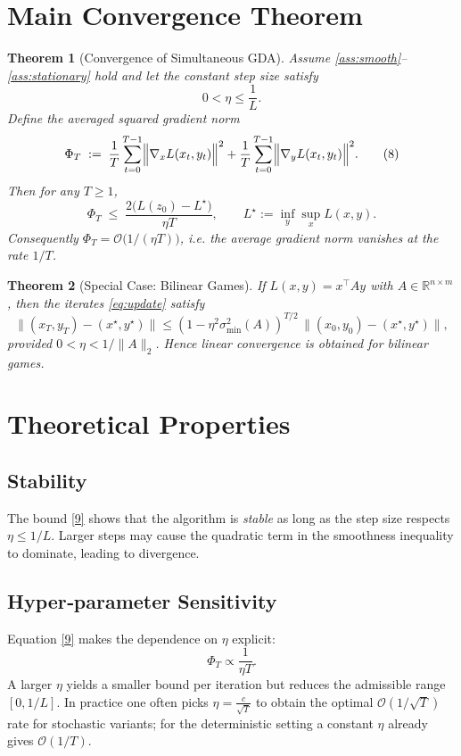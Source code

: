 \documentclass[11pt]{article}
\newtheorem{theorem}{Theorem}[section]
\begin{document}
\section{Main Convergence Theorem}
\begin{theorem}[Convergence of Simultaneous GDA]\label{thm:main}
Assume \ref{ass:smooth}–\ref{ass:stationary} hold and let the constant step size satisfy
\[
0<\eta\le \frac{1}{L}.
\tag{7}
\]
Define the averaged squared gradient norm
\[
\Phi_T \;:=\; \frac{1}{T}\sum_{t=0}^{T-1}\Bigl\|\nabla_{x}L(x_t,y_t)\Bigr\|^{2}
      +\frac{1}{T}\sum_{t=0}^{T-1}\Bigl\|\nabla_{y}L(x_t,y_t)\Bigr\|^{2}.
\tag{8}
\]
Then for any $T\ge 1$,
\[
\Phi_T \;\le\; \frac{2\bigl(L(z_0)-L^{\star}\bigr)}{\eta T},
\qquad 
L^{\star}:=\inf_{y}\sup_{x}L(x,y).
\tag{9}
\]
Consequently $\Phi_T =\mathcal{O}\!\bigl(1/(\eta T)\bigr)$, i.e. the average gradient norm vanishes at the rate $1/T$.
\end{theorem}

\begin{theorem}[Special Case: Bilinear Games]\label{thm:bilinear}
If $L(x,y)=x^{\top}Ay$ with $A\in\mathbb{R}^{n\times m}$, then the iterates \eqref{eq:update} satisfy
\[
\|(x_T,y_T)-(x^{\star},y^{\star})\| \le (1-\eta^2\sigma_{\min}^2(A))^{T/2}\,\|(x_0,y_0)-(x^{\star},y^{\star})\|,
\]
provided $0<\eta<1/\|A\|_2$. Hence linear convergence is obtained for bilinear games.
\end{theorem}

\section{Theoretical Properties}
\subsection{Stability}
The bound \eqref{9} shows that the algorithm is \emph{stable} as long as the step size respects $\eta\le 1/L$. Larger steps may cause the quadratic term in the smoothness inequality to dominate, leading to divergence.

\subsection{Hyper‑parameter Sensitivity}
Equation \eqref{9} makes the dependence on $\eta$ explicit:
\[
\Phi_T \propto \frac{1}{\eta T}.
\]
A larger $\eta$ yields a smaller bound per iteration but reduces the admissible range $[0,1/L]$. In practice one often picks $\eta = \frac{c}{\sqrt{T}}$ to obtain the optimal $\mathcal{O}(1/\sqrt{T})$ rate for stochastic variants; for the deterministic setting a constant $\eta$ already gives $\mathcal{O}(1/T)$.
\end{document}
